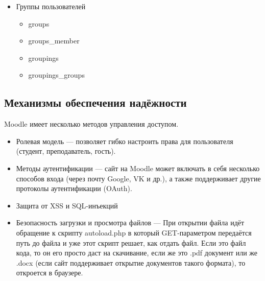 \documentclass[a4paper, 14pt]{extarticle}
\begin{document}
\begin{itemize}
\begin{itemize}
      \item role\_allow\_assign
      \item role\_allow\_override
      \item role\_allow\_switch
      \item role\_assignments
      \item role\_capabilities
      \item role\_context\_levels
      \item role\_names
      \item role\_sortorder
    \end{itemize}
  \item Группы пользователей
    \begin{itemize}
      \item groups
      \item groups\_member
      \item groupings
      \item groupings\_groups
    \end{itemize}
\end{itemize}
\subsection{Механизмы обеспечения надёжности}
Moodle имеет несколько методов управления доступом.
\begin{itemize}
  \item Ролевая модель --- позволяет гибко настроить права для
    пользователя (студент, преподаватель, гость).
  \item Методы аутентификации --- сайт на Moodle может включать в себя
    несколько способов входа (через почту Google, VK и др.), а также
    поддерживает другие протоколы аутентификации (OAuth).
  \item Защита от XSS и SQL-инъекций
  \item Безопасность загрузки и просмотра файлов --- При открытии
    файла идёт обращение к скрипту autoload.php в который
    GET-параметром передаётся путь до файла и уже этот скрипт решает,
    как отдать файл. Если это файл кода, то он его просто даст на
    скачивание, если же это .pdf документ или же .docx (если сайт
    поддерживает открытие документов такого формата), то откроется в браузере.
\end{itemize}
\end{document}
